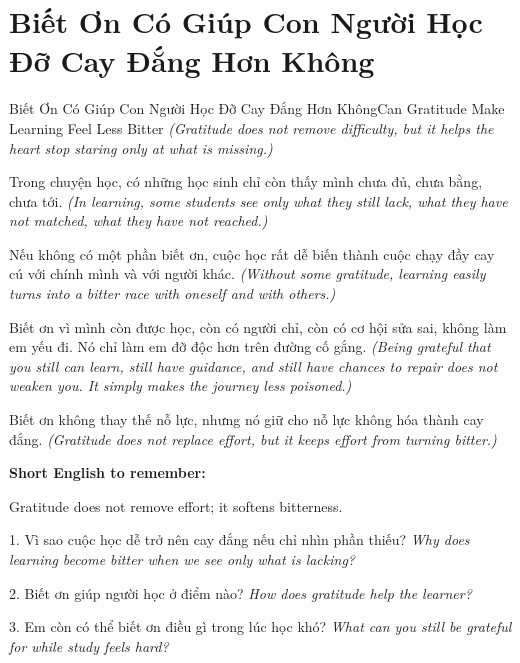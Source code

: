 \section{Biết Ơn Có Giúp Con Người Học Đỡ Cay Đắng Hơn Không}
\begin{truyen}{Biết Ơn Có Giúp Con Người Học Đỡ Cay Đắng Hơn Không}{Can Gratitude Make Learning Feel Less Bitter}
\textit{(Gratitude does not remove difficulty, but it helps the heart stop staring only at what is missing.)}

Trong chuyện học, có những học sinh chỉ còn thấy mình chưa đủ, chưa bằng, chưa tới.
\textit{(In learning, some students see only what they still lack, what they have not matched, what they have not reached.)}

Nếu không có một phần biết ơn, cuộc học rất dễ biến thành cuộc chạy đầy cay cú với chính mình và với người khác.
\textit{(Without some gratitude, learning easily turns into a bitter race with oneself and with others.)}

Biết ơn vì mình còn được học, còn có người chỉ, còn có cơ hội sửa sai, không làm em yếu đi. Nó chỉ làm em đỡ độc hơn trên đường cố gắng.
\textit{(Being grateful that you still can learn, still have guidance, and still have chances to repair does not weaken you. It simply makes the journey less poisoned.)}
\end{truyen}

\begin{baihoc}
Biết ơn không thay thế nỗ lực, nhưng nó giữ cho nỗ lực không hóa thành cay đắng.
\textit{(Gratitude does not replace effort, but it keeps effort from turning bitter.)}
\end{baihoc}

\begin{ghinhoanh}
\textbf{Short English to remember:}

Gratitude does not remove effort; it softens bitterness.

\end{ghinhoanh}

\begin{tuhocnhanh}
1. Vì sao cuộc học dễ trở nên cay đắng nếu chỉ nhìn phần thiếu? \textit{Why does learning become bitter when we see only what is lacking?}

2. Biết ơn giúp người học ở điểm nào? \textit{How does gratitude help the learner?}

3. Em còn có thể biết ơn điều gì trong lúc học khó? \textit{What can you still be grateful for while study feels hard?}
\end{tuhocnhanh}
\ngancach

